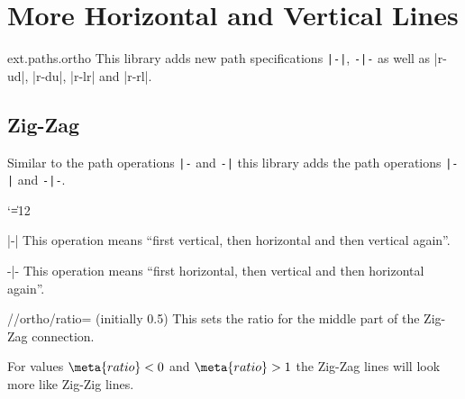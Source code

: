 %
%
%

\section{More Horizontal and Vertical Lines}
\label{library:paths.ortho}

\begin{tikzlibrary}{ext.paths.ortho}
  This library adds new path specifications \verb!|-|!, \verb!-|-! as well as
  |r-ud|, |r-du|, |r-lr| and |r-rl|.
\end{tikzlibrary}

\subsection{Zig-Zag}
Similar to the path operations \verb!|-! and \verb!-|! this library adds\indexPathOperationO{\protect\pgfmanualbar-}\indexPathOperationO{-\protect\pgfmanualbar}
the path operations \verb!|-|! and \verb!-|-!.
{\catcode`\|=12
\begin{pathoperation}[noindex]{|-|}{}
    \pgfmanualpdflabel[\catcode`\|=12 ]{|-|}{}%
    This operation means ``first vertical, then horizontal and then vertical again''.
\end{pathoperation}
\begin{pathoperation}[noindex]{-|-}{}
    \pgfmanualpdflabel[\catcode`\|=12 ]{-|-}{}%
    This operation means ``first horizontal, then vertical and then horizontal again''.
\end{pathoperation}
}
\begin{key}{/\tikzext/ortho/ratio= (initially 0.5)}
  This sets the ratio for the middle part of the Zig-Zag connection.
  
  For values $\meta{ratio} < 0$ and $\meta{ratio} > 1$ the Zig-Zag lines will
  look more like Zig-Zig lines.
\begin{codeexample}[preamble=\usetikzlibrary{ext.paths.ortho}]
\end{codeexample}
\end{key}
